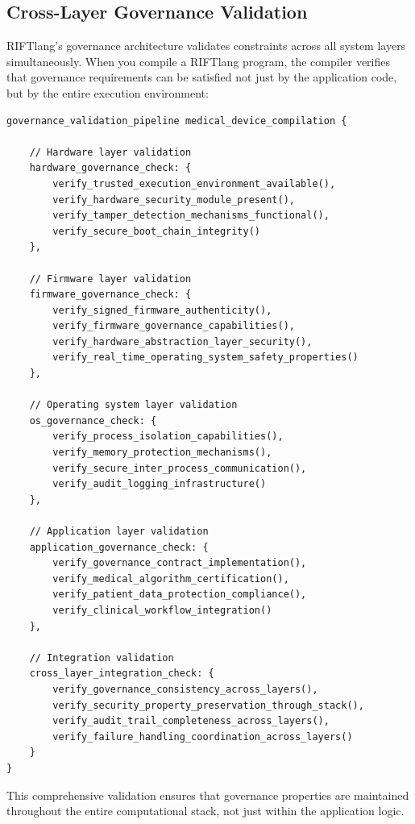 \subsection{Cross-Layer Governance Validation}

RIFTlang's governance architecture validates constraints across all system layers simultaneously. When you compile a RIFTlang program, the compiler verifies that governance requirements can be satisfied not just by the application code, but by the entire execution environment:

\begin{lstlisting}[language=rift, caption=Cross-Layer Governance Validation]
governance_validation_pipeline medical_device_compilation {
    
    // Hardware layer validation
    hardware_governance_check: {
        verify_trusted_execution_environment_available(),
        verify_hardware_security_module_present(),
        verify_tamper_detection_mechanisms_functional(),
        verify_secure_boot_chain_integrity()
    },
    
    // Firmware layer validation  
    firmware_governance_check: {
        verify_signed_firmware_authenticity(),
        verify_firmware_governance_capabilities(),
        verify_hardware_abstraction_layer_security(),
        verify_real_time_operating_system_safety_properties()
    },
    
    // Operating system layer validation
    os_governance_check: {
        verify_process_isolation_capabilities(),
        verify_memory_protection_mechanisms(),
        verify_secure_inter_process_communication(),
        verify_audit_logging_infrastructure()
    },
    
    // Application layer validation
    application_governance_check: {
        verify_governance_contract_implementation(),
        verify_medical_algorithm_certification(),
        verify_patient_data_protection_compliance(),
        verify_clinical_workflow_integration()
    },
    
    // Integration validation
    cross_layer_integration_check: {
        verify_governance_consistency_across_layers(),
        verify_security_property_preservation_through_stack(),
        verify_audit_trail_completeness_across_layers(),
        verify_failure_handling_coordination_across_layers()
    }
}
\end{lstlisting}

This comprehensive validation ensures that governance properties are maintained throughout the entire computational stack, not just within the application logic.

